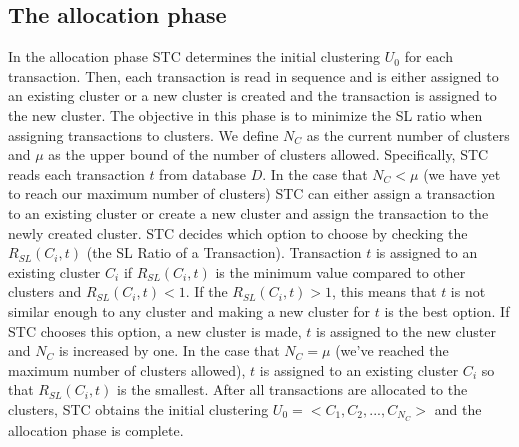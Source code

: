 \documentclass[11pt,reqno]{amsart}
\theoremstyle{definition}
\numberwithin{equation}{subsection}
\begin{document}
\subsection{The allocation phase}  In the allocation phase STC determines the initial clustering $U_0$ for each transaction. Then, each transaction is read in sequence and is either assigned to an existing cluster or a new cluster is created and the transaction is assigned to the new cluster. The objective in this phase is to minimize the SL ratio when assigning transactions to clusters.  We define $N_C$ as the current number of clusters and $\mu$ as the upper bound of the number of clusters allowed. Specifically, STC reads each transaction $t$ from database $D$. In the case that $N_C < \mu$ (we have yet to reach our maximum number of clusters) STC can either assign a transaction to an existing cluster or create a new cluster and assign the transaction to the newly created cluster. STC decides which option to choose by checking the $R_{SL}(C_i,t)$ (the SL Ratio of a Transaction). Transaction $t$ is assigned to an existing cluster $C_i$ if  $R_{SL}(C_i,t)$ is the minimum value compared to other clusters and $R_{SL}(C_i,t) < 1$. If the $R_{SL}(C_i,t) > 1$, this means that $t$ is not similar enough to any cluster and making a new cluster for $t$ is the best option.  If STC chooses this option, a new cluster is made, $t$ is assigned to the new cluster and $N_C$ is increased by one. In the case that $N_C = \mu$ (we've reached the maximum number of clusters allowed), $t$ is assigned to an existing cluster $C_i$ so that $R_{SL}(C_i,t)$ is the smallest. After all transactions are allocated to the clusters, STC obtains the initial clustering $U_0 =< C_1 , C_2 , ..., C_{N_C} >$ and the allocation phase is complete.
\end{document}
